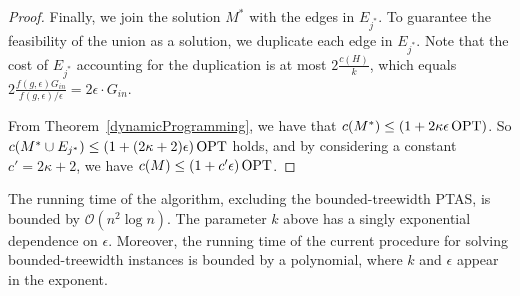 \begin{proof}
    Finally, we join the solution \(M^\ast\) with the edges in \(E_{j^\ast}\). To guarantee the feasibility of the union as a solution, we duplicate each edge in \(E_{j^\ast}\). Note that the cost of \(E_{j^\ast}\) accounting for the duplication is at most \(2 \frac{c(H)}{k}\), which equals \(2 \frac{f(g, \epsilon) G_{in}}{f(g, \epsilon) / \epsilon} = 2 \epsilon \cdot G_{in}\).

    From Theorem~\ref{dynamicProgramming}, we have that \(c(M^\ast) \leq (1 + 2 \kappa \epsilon \operatorname{\textrm{OPT}})\). So \(c(M^\ast \cup E_{j^\ast}) \leq (1 + (2 \kappa + 2) \epsilon) \operatorname{\textrm{OPT}}\) holds, and by considering a constant \(c' = 2 \kappa + 2\), we have \(c(M) \leq (1 + c' \epsilon) \operatorname{\textrm{OPT}}\).

\end{proof}

The running time of the algorithm, excluding the bounded-treewidth PTAS, is bounded by \(\mathcal{O}(n^2 \log n)\). The parameter \(k\) above has a singly exponential dependence on \(\epsilon\). Moreover, the running time of the current procedure for solving bounded-treewidth instances is bounded by a polynomial, where \(k\) and \(\epsilon\) appear in the exponent.
